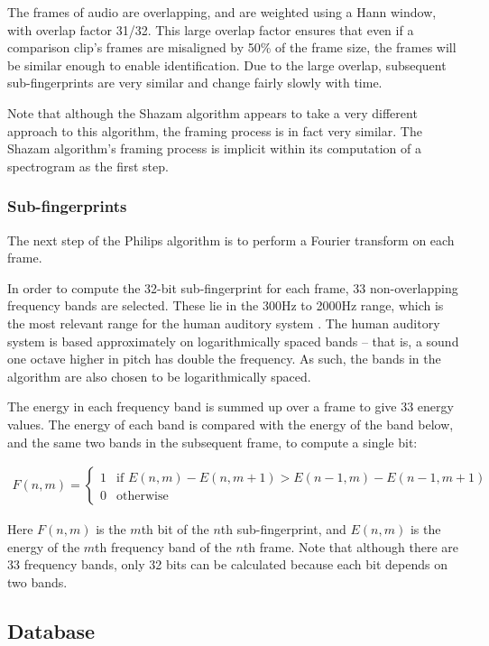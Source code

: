 \documentclass[12pt,a4paper,twoside,openright]{report}
\begin{document}
The frames of audio are overlapping, and are weighted using a Hann window, with overlap factor 31/32. This large overlap factor ensures that even if a comparison clip's frames are misaligned by 50\% of the frame size, the frames will be similar enough to enable identification. Due to the large overlap, subsequent sub-fingerprints are very similar and change fairly slowly with time. 

Note that although the Shazam algorithm appears to take a very different approach to this algorithm, the framing process is in fact very similar. The Shazam algorithm's framing process is implicit within its computation of a spectrogram as the first step.

\subsubsection{Sub-fingerprints}

The next step of the Philips algorithm is to perform a Fourier transform on each frame.

In order to compute the 32-bit sub-fingerprint for each frame, 33 non-overlapping frequency bands are selected. These lie in the 300Hz to 2000Hz range, which is the most relevant range for the human auditory system \cite{Haitsma02}. The human auditory system is based approximately on logarithmically spaced bands -- that is, a sound one octave higher in pitch has double the frequency. As such, the bands in the algorithm are also chosen to be logarithmically spaced.

The energy in each frequency band is summed up over a frame to give 33 energy values. The energy of each band is compared with the energy of the band below, and the same two bands in the subsequent frame, to compute a single bit:

\begin{align*}
  F(n,m)=
  \begin{cases}
      1 & \text{if } E(n,m)-E(n,m+1) > E(n-1,m)-E(n-1,m+1)\\
      0 & \text{otherwise}
  \end{cases}
\end{align*}

Here $F(n,m)$ is the $m$th bit of the $n$th sub-fingerprint, and $E(n,m)$ is the energy of the $m$th frequency band of the $n$th frame. Note that although there are 33 frequency bands, only 32 bits can be calculated because each bit depends on two bands.


\subsection{Database}
\end{document}
